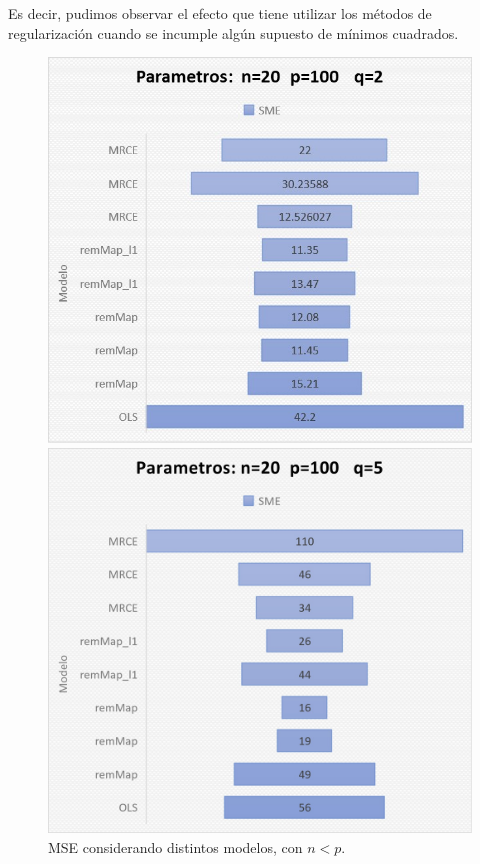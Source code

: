 \documentclass{article}
\begin{document}
Es decir, pudimos observar el efecto que tiene utilizar los métodos de regularización cuando se incumple algún supuesto de mínimos cuadrados.
 \begin{figure}[H]
   \includegraphics[scale=.65]{figure/im1.jpg}
  \caption{}
 \endminipage
   \includegraphics[scale=.65]{figure/im2.jpg}
  \caption{}
 \endminipage
 \caption{MSE considerando distintos modelos, con $n<p.$}\label{MSE_1}
 \end{figure}
\end{document}
